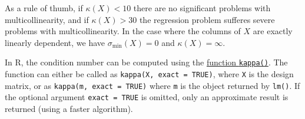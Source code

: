 \documentclass[
  a4paper,
]{article}
\theoremstyle{definition}
\theoremstyle{definition}
\theoremstyle{definition}
\theoremstyle{definition}
\theoremstyle{remark}
\begin{document}
As a rule of thumb, if \(\kappa(X) < 10\) there are no significant problems
with multicollinearity, and if \(\kappa(X) > 30\) the regression problem
sufferes severe problems with multicollinearity. In the case where the
columns of \(X\) are exactly linearly dependent, we have \(\sigma_\mathrm{min}(X) = 0\) and \(\kappa(X) = \infty\).

In R, the condition number can be computed using the
\href{https://rdrr.io/r/base/kappa.html}{function \texttt{kappa()}}. The function
can either be called as \texttt{kappa(X,\ exact\ =\ TRUE)},
where \texttt{X} is the design matrix,
or as \texttt{kappa(m,\ exact\ =\ TRUE)}
where \texttt{m} is the object returned by \texttt{lm()}. If the optional
argument \texttt{exact\ =\ TRUE} is omitted, only an approximate result
is returned (using a faster algorithm).
\end{document}
